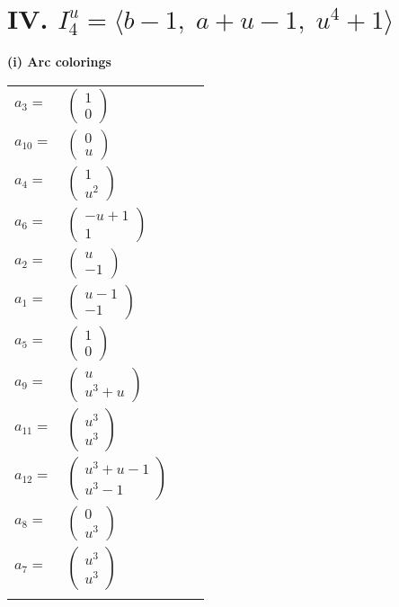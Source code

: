 \documentclass[1p]{elsarticle_modified}
\theoremstyle{definition}
\begin{document}
\centering \section*{IV. $I^u_{4}= \langle b-1,\;a+u-1,\;u^4+1 \rangle$}
\flushleft \textbf{(i) Arc colorings}\\
\begin{tabular}{m{7pt} m{180pt} m{7pt} m{180pt} }
\flushright $a_{3}=$&$\begin{pmatrix}1\\0\end{pmatrix}$ \\
\flushright $a_{10}=$&$\begin{pmatrix}0\\u\end{pmatrix}$ \\
\flushright $a_{4}=$&$\begin{pmatrix}1\\u^2\end{pmatrix}$ \\
\flushright $a_{6}=$&$\begin{pmatrix}- u+1\\1\end{pmatrix}$ \\
\flushright $a_{2}=$&$\begin{pmatrix}u\\-1\end{pmatrix}$ \\
\flushright $a_{1}=$&$\begin{pmatrix}u-1\\-1\end{pmatrix}$ \\
\flushright $a_{5}=$&$\begin{pmatrix}1\\0\end{pmatrix}$ \\
\flushright $a_{9}=$&$\begin{pmatrix}u\\u^3+u\end{pmatrix}$ \\
\flushright $a_{11}=$&$\begin{pmatrix}u^3\\u^3\end{pmatrix}$ \\
\flushright $a_{12}=$&$\begin{pmatrix}u^3+u-1\\u^3-1\end{pmatrix}$ \\
\flushright $a_{8}=$&$\begin{pmatrix}0\\u^3\end{pmatrix}$ \\
\flushright $a_{7}=$&$\begin{pmatrix}u^3\\u^3\end{pmatrix}$\\&\end{tabular}
\end{document}
